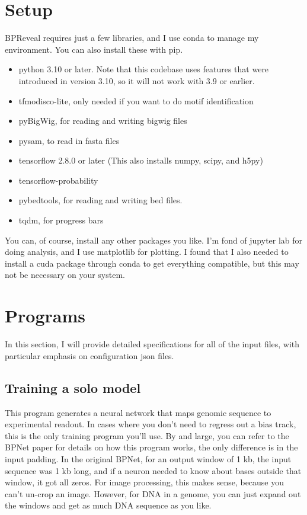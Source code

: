 \documentclass{article}
\begin{document}
\section{Setup}

BPReveal requires just a few libraries, and I use conda to manage my environment. You can also install these with pip. 

\begin{itemize}
    \item python 3.10 or later. Note that this codebase uses features that were introduced in version 3.10, so it will not work with 3.9 or earlier. 
    \item tfmodisco-lite, only needed if you want to do motif identification
    \item pyBigWig, for reading and writing bigwig files
    \item pysam, to read in fasta files
    \item tensorflow 2.8.0 or later (This also installs numpy, scipy, and h5py)
    \item tensorflow-probability
    \item pybedtools, for reading and writing bed files.
    \item tqdm, for progress bars
\end{itemize}

You can, of course, install any other packages you like. 
I'm fond of jupyter lab for doing analysis, and I use matplotlib for plotting. 
I found that I also needed to install a cuda package through conda to get everything compatible, but this may not be necessary on your system. 



\section{Programs}

In this section, I will provide detailed specifications for all of the input files, with particular emphasis on configuration json files.

\subsection{Training a solo model}

This program generates a neural network that maps genomic sequence to experimental readout. 
In cases where you don't need to regress out a bias track, this is the only training program you'll use. 
By and large, you can refer to the BPNet paper for details on how this program works, the only difference is in the input padding. 
In the original BPNet, for an output window of 1 kb, the input sequence was 1 kb long, and if a neuron needed to know about bases outside that window, it got all zeros. 
For image processing, this makes sense, because you can't un-crop an image. However, for DNA in a genome, you can just expand out the windows and get as much DNA sequence as you like.
\end{document}
